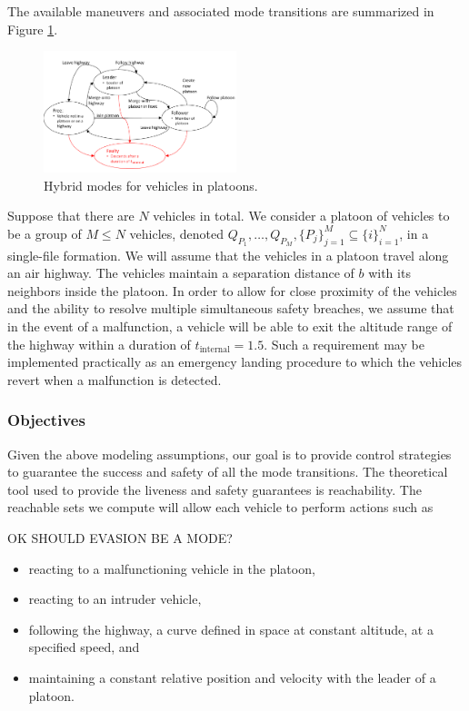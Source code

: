 The available maneuvers and associated mode transitions are summarized in Figure \ref{fig:vehicleModes}.

\begin{figure}
	\centering
	\includegraphics[width=0.5\textwidth]{"fig/vehicleModes"}
	\caption{Hybrid modes for vehicles in platoons.}
	\label{fig:vehicleModes}
\end{figure}

Suppose that there are $N$ vehicles in total. We consider a platoon of vehicles to be a group of $M\le N$ vehicles, denoted $Q_{P_1}, \ldots, Q_{P_M}, \{P_j\}_{j=1}^M \subseteq \{i\}_{i=1}^N$, in a single-file formation. We will assume that the vehicles in a platoon travel along an air highway. The vehicles maintain a separation distance of $b$ with its neighbors inside the platoon. In order to allow for close proximity of the vehicles and the ability to resolve multiple simultaneous safety breaches, we assume that in the event of a malfunction, a vehicle will be able to exit the altitude range of the highway within a duration of $t_\text{internal}=1.5$. Such a requirement may be implemented practically as an emergency landing procedure to which the vehicles revert when a malfunction is detected.

\subsubsection{Objectives}
Given the above modeling assumptions, our goal is to provide control strategies to guarantee the success and safety of all the mode transitions. The theoretical tool used to provide the liveness and safety guarantees is reachability. The reachable sets we compute will allow each vehicle to perform actions such as 

OK SHOULD EVASION BE A MODE?

\begin{itemize}

\item reacting to a malfunctioning vehicle in the platoon,
\item reacting to an intruder vehicle,
\item following the highway, a curve defined in space at constant altitude, at a specified speed, and
\item maintaining a constant relative position and velocity with the leader of a platoon.
\end{itemize}


